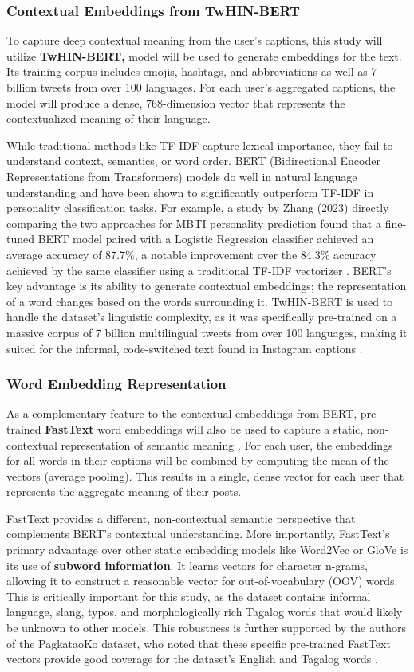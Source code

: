 \subsubsection{Contextual Embeddings from TwHIN-BERT}
To capture deep contextual meaning from the user's captions, this study will utilize \textbf{TwHIN-BERT,} model will be used to generate embeddings for the text. Its training corpus includes emojis, hashtags, and abbreviations as well as 7 billion tweets from over 100 languages. For each user's aggregated captions, the model will produce a dense, 768-dimension vector that represents the contextualized meaning of their language.

While traditional methods like TF-IDF capture lexical importance, they fail to understand context, semantics, or word order. BERT (Bidirectional Encoder Representations from Transformers) models do well in natural language understanding and have been shown to significantly outperform TF-IDF in personality classification tasks. For example, a study by Zhang (2023) directly comparing the two approaches for MBTI personality prediction found that a fine-tuned BERT model paired with a Logistic Regression classifier achieved an average accuracy of 87.7\%, a notable improvement over the 84.3\% accuracy achieved by the same classifier using a traditional TF-IDF vectorizer \citep{zhang2023}. BERT's key advantage is its ability to generate contextual embeddings; the representation of a word changes based on the words surrounding it. TwHIN-BERT is used to handle the dataset's linguistic complexity, as it was specifically pre-trained on a massive corpus of 7 billion multilingual tweets from over 100 languages, making it suited for the informal, code-switched text found in Instagram captions \citep{zhang2023}.

\subsubsection{Word Embedding Representation}
As a complementary feature to the contextual embeddings from BERT, pre-trained \textbf{FastText} word embeddings will also be used to capture a static, non-contextual representation of semantic meaning \citep{grave2018}. For each user, the embeddings for all words in their captions will be combined by computing the mean of the vectors (average pooling). This results in a single, dense vector for each user that represents the aggregate meaning of their posts.

FastText provides a different, non-contextual semantic perspective that complements BERT's contextual understanding. More importantly, FastText's primary advantage over other static embedding models like Word2Vec or GloVe is its use of \textbf{subword information}. It learns vectors for character n-grams, allowing it to construct a reasonable vector for out-of-vocabulary (OOV) words. This is critically important for this study, as the dataset contains informal language, slang, typos, and morphologically rich Tagalog words that would likely be unknown to other models. This robustness is further supported by the authors of the PagkataoKo dataset, who noted that these specific pre-trained FastText vectors provide good coverage for the dataset's English and Tagalog words \citep{tighe_acorda_2022}.

